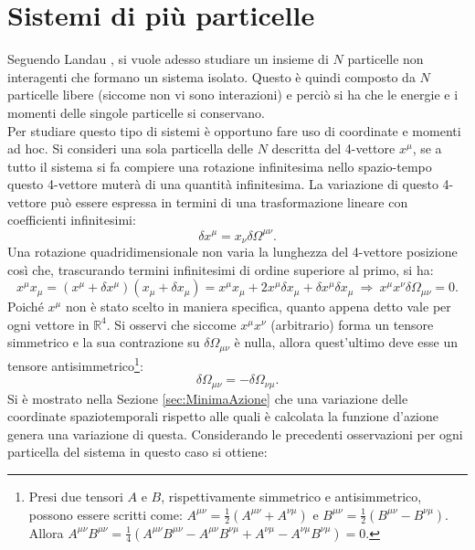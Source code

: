\section{Sistemi di più particelle}
Seguendo Landau \cite{Landau}, si vuole adesso studiare un insieme di $N$ particelle non interagenti che formano un sistema isolato.
Questo è quindi composto da $N$ particelle libere (siccome non vi sono interazioni) e perciò si ha che le energie e i momenti delle singole particelle si conservano.\\

Per studiare questo tipo di sistemi è opportuno fare uso di coordinate e momenti ad hoc. Si consideri una sola particella delle $N$ descritta del 4-vettore $x^\mu$, se a tutto il sistema si fa compiere una rotazione infinitesima nello spazio-tempo questo 4-vettore muterà di una quantità infinitesima. La variazione di questo 4-vettore può essere espressa in termini di una trasformazione lineare con coefficienti infinitesimi:
\begin{equation*}
    \delta x^\mu=x_\nu\delta \Omega^{\mu\nu}.
\end{equation*}
Una rotazione quadridimensionale non varia la lunghezza del 4-vettore posizione così che, trascurando termini infinitesimi di ordine superiore al primo, si ha: 
\begin{equation*}
    x^\mu x_\mu=(x^\mu+\delta x^\mu)(x_\mu+\delta x_\mu)= x^\mu x_\mu+2x^\mu \delta x_\mu+ \delta x^\mu\delta x_\mu\ \Rightarrow \ x^\mu x^\nu \delta \Omega_{\mu \nu}=0.
\end{equation*}
Poiché $x^\mu$ non è stato scelto in maniera specifica, quanto appena detto vale per ogni vettore in $\mathbb{R}^4$. Si osservi che siccome $x^\mu x^\nu$ (arbitrario) forma un tensore simmetrico e la sua contrazione su $\delta \Omega_{\mu \nu}$ è nulla, allora quest'ultimo deve esse un tensore antisimmetrico\footnote{Presi due tensori $A$ e $B$, rispettivamente simmetrico e antisimmetrico, possono essere scritti come: $A^{\mu\nu}=\frac{1}{2}(A^{\mu\nu}+A^{\nu\mu})$ e $B^{\mu\nu}=\frac{1}{2}(B^{\mu\nu}-B^{\nu\mu})$. Allora $A^{\mu\nu}B^{\mu\nu}=\frac{1}{4}(A^{\mu\nu}B^{\mu\nu}-A^{\mu\nu}B^{\nu\mu}+A^{\nu\mu}-A^{\nu\mu}B^{\nu\mu})=0$.}:
\begin{equation}
    \delta\Omega_{\mu \nu}=-\delta\Omega_{\nu \mu}.
\end{equation}
Si è mostrato nella Sezione \ref{sec:MinimaAzione} che una variazione delle coordinate spaziotemporali rispetto alle quali è calcolata la funzione d'azione genera una variazione di questa. Considerando le precedenti osservazioni per ogni particella del sistema in questo caso si ottiene:

